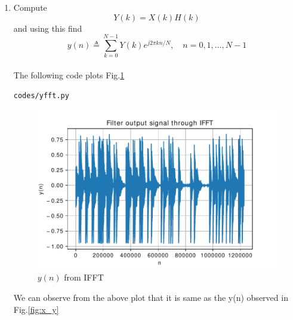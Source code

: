 \documentclass[journal,12pt,twocolumn]{IEEEtran}
\renewcommand\thesection{\arabic{section}}
\begin{document}
\begin{enumerate}[label=\thesection.\arabic*
,ref=\thesection.\theenumi]
\item Compute
\begin{equation}
Y(k) = X(k)H(k)
\end{equation}
and using this find 
\begin{equation}
y(n) \triangleq \sum_{k=0}^{N-1} Y(k) e^{j 2 \pi k n / N}, \quad n=0,1, \ldots, N-1
\end{equation}
\\
\solution
The following code plots Fig.\ref{fig:yfft}
\begin{lstlisting}
codes/yfft.py
\end{lstlisting}
\begin{figure}[!ht]
\centering
\includegraphics[width=\columnwidth]{./figs/yfft}
\caption{$y(n)$ from IFFT}
\label{fig:yfft}
\end{figure}

We can observe from the above plot that it is same as the y(n) observed in Fig.\ref{fig:x_y}
\end{enumerate}
\end{document}
